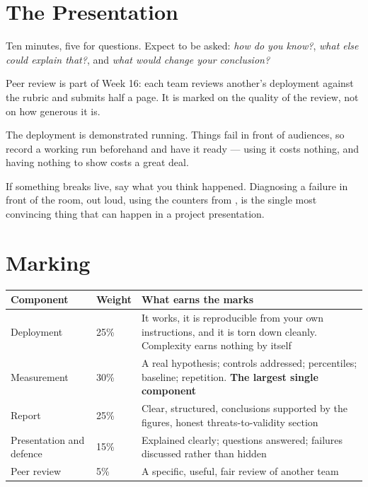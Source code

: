 \section{The Presentation}

Ten minutes, five for questions. Expect to be asked: \emph{how do you know?},
\emph{what else could explain that?}, and \emph{what would change your
conclusion?}

Peer review is part of Week 16: each team reviews another's deployment against
the rubric and submits half a page. It is marked on the quality of the review,
not on how generous it is.

\begin{conceptbox}
The deployment is demonstrated running. Things fail in front of audiences, so
record a working run beforehand and have it ready --- using it costs nothing,
and having nothing to show costs a great deal.

\smallskip
If something breaks live, say what you think happened. Diagnosing a failure in
front of the room, out loud, using the counters from , is
the single most convincing thing that can happen in a project presentation.
\end{conceptbox}

\section{Marking}

\begin{longtable}{@{}L{3.6cm}L{1.6cm}L{9.5cm}@{}}
\toprule
{}
\textbf{Component} & \textbf{Weight} & \textbf{What earns the marks} \\
\midrule
\endhead
Deployment & 25\% & It works, it is reproducible from your own instructions,
and it is torn down cleanly. Complexity earns nothing by itself \\
Measurement & 30\% & A real hypothesis; controls addressed; percentiles;
baseline; repetition. \textbf{The largest single component} \\
Report & 25\% & Clear, structured, conclusions supported by the figures, honest
threats-to-validity section \\
Presentation and defence & 15\% & Explained clearly; questions answered;
failures discussed rather than hidden \\
Peer review & 5\% & A specific, useful, fair review of another team \\
\bottomrule
\end{longtable}


